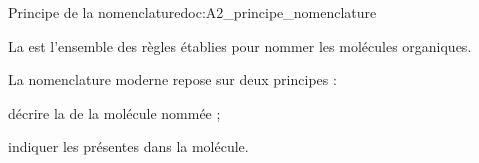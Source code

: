 

\newpage
\vspace*{-24pt}

\begin{doc}{Principe de la nomenclature}{doc:A2_principe_nomenclature}
  \begin{importants}  
    La  est l'ensemble des règles établies pour nommer les molécules organiques.
  \end{importants}
   
  La nomenclature moderne repose sur deux principes :
  \begin{listePoints}
    \item décrire la  de la molécule nommée ;
    \item indiquer les  présentes dans la molécule.
  \end{listePoints}
\end{doc}

